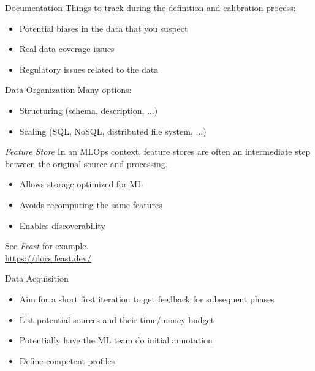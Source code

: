 \begin{frame}{Documentation}
  Things to track during the definition and calibration process:

  \begin{itemize}
    \item Potential biases in the data that you suspect
    \item Real data coverage issues
    \item Regulatory issues related to the data
  \end{itemize}


  \hugo
\end{frame}




\begin{frame}{Data Organization}
  Many options:
  \begin{itemize}
    \item Structuring (schema, description, ...)
    \item Scaling (SQL, NoSQL, distributed file system, ...)
  \end{itemize}

  \hugo
\end{frame}


\begin{frame}{\textit{Feature Store}}
  In an MLOps context, feature stores are often an intermediate step
  between the original source and processing.

  \begin{itemize}
    \item Allows storage optimized for ML
    \item Avoids recomputing the same features
    \item Enables discoverability
  \end{itemize}

  See \textit{Feast} for example.\\
   \url{https://docs.feast.dev/}

  \hugo
\end{frame}


\begin{frame}{Data Acquisition}
  \begin{itemize}
    \item Aim for a short first iteration to get feedback for subsequent phases
    \item List potential sources and their time/money budget
    \item Potentially have the ML team do initial annotation
    \item Define competent profiles
  \end{itemize}

  \hugo
\end{frame}



